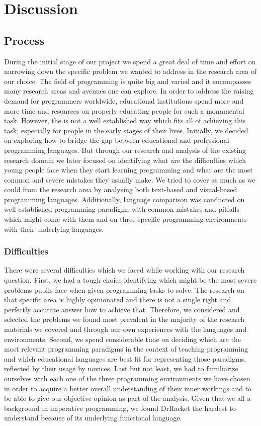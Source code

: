 \chapter{Discussion}
\label{chap:discussion}

\section{Process}

During the initial stage of our project we spend a great deal of time and effort on narrowing down the specific problem we wanted to address in the research area of our choice. The field of programming is quite big and varied and it encompasses many research areas and avenues one can explore. In order to address  the raising demand for programmers worldwide, educational institutions spend more and more time and resources on properly educating people for such a monumental task. However, the is not a well established way which fits all of achieving this task, especially for people in the early stages of their lives. Initially, we decided on exploring how to bridge the gap between educational and professional programming languages. But through our research and analysis of the existing research domain we later focused on identifying what are the difficulties which young people face when they start learning programming and what are the most common and severe mistakes they usually make. We tried to cover as much as we could from the research area by analysing both text-based and visual-based programming languages. Additionally, language comparison was conducted on well established programming paradigms with common mistakes and pitfalls which might come with them and on three specific programming environments  with their underlying languages.
\subsection{Difficulties}

There were several difficulties which we faced while working with our research question. First, we had a tough choice identifying which might be the most severe problems pupils face when given programming tasks to solve. The research on that specific area is highly opinionated and there is not a single right and perfectly accurate answer how to achieve that. Therefore, we considered and selected the problems we found most prevalent in the majority of the research materials we covered and through our own experiences with the languages and environments. Second, we spend considerable time on deciding which are the most relevant programming paradigms in the context of teaching programming and which educational languages are best fit for representing those paradigms, reflected by their usage by novices. Last but not least, we had to familiarize ourselves with each one of the three programming environments we have chosen in order to acquire a better overall understanding of their inner workings and to be able to give our objective opinion as part of the analysis. Given that we all a background in imperative programming, we found DrRacket the hardest to understand because of its underlying functional language.
